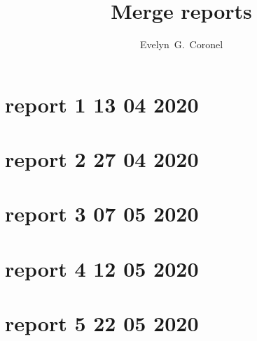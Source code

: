 \documentclass{ibtesis}
\title{Merge reports}
\author{Evelyn~G.~Coronel}
\begin{document}
\chapter{report 1 13 04 2020}

\graphicspath{{report_1_13_04_2020/}}


\chapter{report 2 27 04 2020}
\graphicspath{{report_2_27_04_2020/}}


\chapter{report 3 07 05 2020}
\graphicspath{{report_3_07_05_2020/}}


\chapter{report 4 12 05 2020}
\graphicspath{{report_4_12_05_2020/}}


\chapter{report 5 22 05 2020}
\graphicspath{{report_5_22_05_2020/}}

\end{document}

